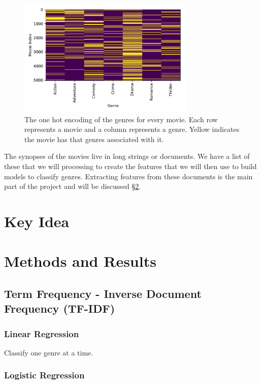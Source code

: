 \documentclass[11pt]{article}
\begin{document}
\begin{figure}[ht]
	\centering
		\includegraphics[width=0.75\textwidth]{one_hot_genres.pdf}
	\caption{The one hot encoding of the genres for every movie. Each row represents a movie and a column represents a genre. Yellow indicates the movie has that genres associated with it.}
	\label{fig:one_hot}
\end{figure}

The synopses of the movies live in long strings or documents. We have a list of these that we will processing to create the features that we will then use to build models to classify genres. Extracting features from these documents is the main part of the project and will be discussed \S \ref{sec:methods}.

\section{Key Idea}
\label{sec:key_idea}

\section{Methods and Results}
\label{sec:methods}

\subsection{Term Frequency - Inverse Document Frequency (TF-IDF)}
\label{sec:tfidf}

\subsubsection{Linear Regression}

Classify one genre at a time.

\subsubsection{Logistic Regression}
\end{document}
